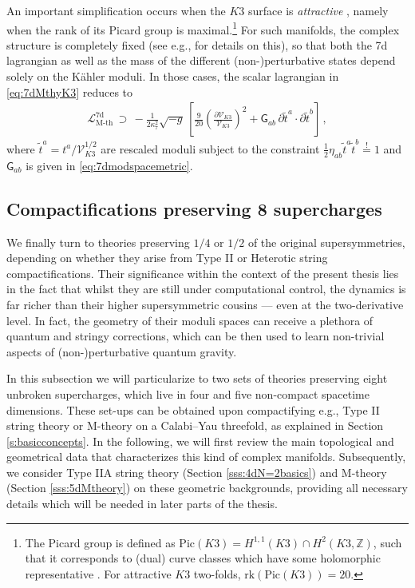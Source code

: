 An important simplification occurs when the $K3$ surface is \emph{attractive} \cite{Moore:1998pn}, namely when the rank of its Picard group is maximal.\footnote{The Picard group is defined as $\text{Pic}(K3)= H^{1,1}(K3) \cap H^2(K3,\mathbb{Z})$, such that it corresponds to (dual) curve classes which have some holomorphic representative \cite{Aspinwall:1996mn}. For attractive $K3$ two-folds, $\text{rk}(\text{Pic}(K3))=20$.} For such manifolds, the complex structure is completely fixed (see e.g., \cite{Moore:1998zu} for details on this), so that both the 7d lagrangian as well as the mass of the different (non-)perturbative states depend solely on the K\"ahler moduli. In those cases, the scalar lagrangian in \eqref{eq:7dMthyK3} reduces to
%
\begin{equation}\label{eq:7dMthyattractive}
	\begin{aligned}
		\mathcal{L}_\text{M-th}^{\text{7d}}\, \supset\, - \frac{1}{2\kappa^2_7} \sqrt{-g}\,  \left[ \frac{9}{20} \left(\frac{\partial \mathcal{V}_{K3}}{\mathcal{V}_{K3}} \right)^2 + \mathsf{G}_{a b}\, \partial \tilde{t}^a \cdot \partial \tilde{t}^b \right]\, ,
	\end{aligned}
\end{equation}
%
where $\tilde{t}^a= t^a/\mathcal{V}_{K3}^{1/2}$ are rescaled moduli subject to the constraint $ \frac{1}{2} \eta_{ab} \tilde{t}^a \tilde{t}^b \stackrel{!}{=} 1$ and $\mathsf{G}_{a b}$ is given in \eqref{eq:7dmodspacemetric}. 


\subsection{Compactifications preserving 8 supercharges} \label{ss:8supercharges}

We finally turn to theories preserving $1/4$ or $1/2$ of the original supersymmetries, depending on whether they arise from Type II or Heterotic string compactifications. Their significance within the context of the present thesis lies in the fact that whilst they are still under computational control, the dynamics is far richer than their higher supersymmetric cousins --- even at the two-derivative level. In fact, the geometry of their moduli spaces can receive a plethora of quantum and stringy corrections, which can be then used to learn non-trivial aspects of (non-)perturbative quantum gravity. 

In this subsection we will particularize to two sets of theories preserving eight unbroken supercharges, which live in four and five non-compact spacetime dimensions. These set-ups can be obtained upon compactifying e.g., Type II string theory or M-theory on a Calabi--Yau threefold, as explained in Section \ref{s:basicconcepts}. In the following, we will first review the main topological and geometrical data that characterizes this kind of complex manifolds. Subsequently, we consider Type IIA string theory (Section \ref{sss:4dN=2basics}) and M-theory (Section \ref{sss:5dMtheory}) on these geometric backgrounds, providing all necessary details which will be needed in later parts of the thesis.

